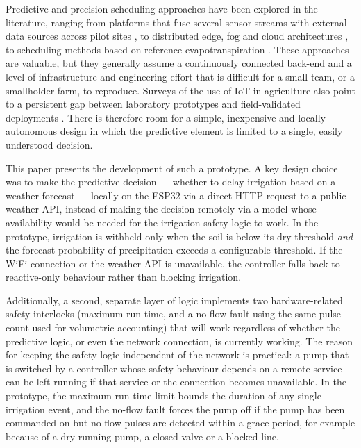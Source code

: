 \documentclass[conference]{IEEEtran}
\begin{document}
Predictive and precision scheduling approaches have been explored in the
literature, ranging from platforms that fuse several sensor streams with
external data sources across pilot sites \cite{kamienski2019smart}, to
distributed edge, fog and cloud architectures
\cite{ferrandez2018precision}, to scheduling methods based on reference
evapotranspiration \cite{allen1998fao56}. These approaches are valuable, but
they generally assume a continuously connected back-end and a level of
infrastructure and engineering effort that is difficult for a small team, or a
smallholder farm, to reproduce. Surveys of the use of IoT in agriculture also
point to a persistent gap between laboratory prototypes and field-validated
deployments \cite{tzounis2017iot,verdouw2016iot}. There is therefore room for
a simple, inexpensive and locally autonomous design in which the predictive
element is limited to a single, easily understood decision.

This paper presents the development of such a prototype. A key design choice
was to make the predictive decision --- whether to delay irrigation based on a
weather forecast --- locally on the ESP32 via a direct HTTP request to a
public weather API, instead of making the decision remotely via a model whose
availability would be needed for the irrigation safety logic to work. In the
prototype, irrigation is withheld only when the soil is below its dry
threshold \emph{and} the forecast probability of precipitation exceeds a
configurable threshold. If the WiFi connection or the weather API is
unavailable, the controller falls back to reactive-only behaviour rather than
blocking irrigation.

Additionally, a second, separate layer of logic implements two hardware-related
safety interlocks (maximum run-time, and a no-flow fault using the same pulse
count used for volumetric accounting) that will work regardless of whether the
predictive logic, or even the network connection, is currently working. The
reason for keeping the safety logic independent of the network is practical: a
pump that is switched by a controller whose safety behaviour depends on a
remote service can be left running if that service or the connection becomes
unavailable. In the prototype, the maximum run-time limit bounds the duration
of any single irrigation event, and the no-flow fault forces the pump off if
the pump has been commanded on but no flow pulses are detected within a grace
period, for example because of a dry-running pump, a closed valve or a
blocked line.
\end{document}
